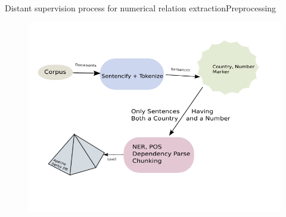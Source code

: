 \documentclass{beamer}
\begin{document}
\begin{frame}{Distant supervision process for numerical relation extraction}{Preprocessing}
 \begin{figure}[h]
 \centering
 \includegraphics[bb=0 0 363 272, scale = 0.8]{./imgs/pipeline.pdf}
\end{figure}
\end{frame}
\end{document}
